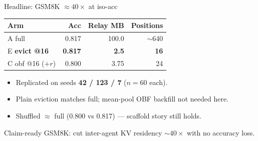 \documentclass[aspectratio=169]{beamer}
\begin{document}
\begin{frame}{Headline: GSM8K $\approx 40\times$ at iso-acc}
\begin{center}
\begin{tabular}{lrrr}
\toprule
Arm & Acc & Relay MB & Positions \\
\midrule
A full & 0.817 & 100.0 & $\sim$640 \\
E \textbf{evict @16} & \textbf{0.817} & \textbf{2.5} & \textbf{16} \\
C obf @16 ($+r$) & 0.800 & 3.75 & 24 \\
\bottomrule
\end{tabular}
\end{center}
\vspace{0.4em}
\begin{itemize}
  \item Replicated on seeds \textbf{42 / 123 / 7} ($n{=}60$ each).
  \item Plain eviction matches full; mean-pool OBF backfill not needed here.
  \item Shuffled $\approx$ full (0.800 vs 0.817) --- scaffold story still holds.
\end{itemize}
\begin{alertblock}{Claim-ready}
GSM8K: cut inter-agent KV residency $\sim\!40\times$ with no accuracy loss.
\end{alertblock}
\end{frame}
\end{document}
